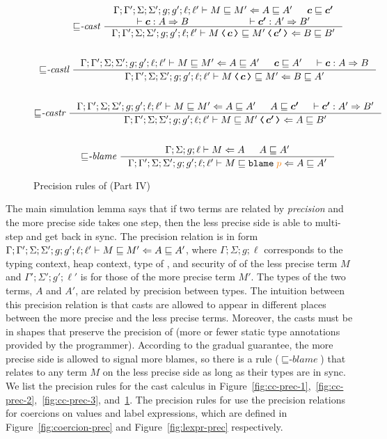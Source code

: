\begin{figure}[tbp]
\raggedright
  {\small
  \begin{gather*}
  {\sqsubseteq}\textit{-cast}~
  \inference
  {\precctx{\Gamma}{\Gamma'}{\Sigma}{\Sigma'}{g}{g'}{\ell}{\ell'}\ccprec{M}{M'}{A}{A'} & \bm{c} \sqsubseteq \bm{c'} \\
   \vdash \bm{c} : A \Rightarrow B & \vdash \bm{c'} : A' \Rightarrow B'}
  {\precctx{\Gamma}{\Gamma'}{\Sigma}{\Sigma'}{g}{g'}{\ell}{\ell'}\ccprec{\cccast{M}{\bm{c}}}{\cccast{M'}{\bm{c'}}}{B}{B'}}
  \\[4ex]
  {\sqsubseteq}\textit{-castl}~
  \inference
  {\precctx{\Gamma}{\Gamma'}{\Sigma}{\Sigma'}{g}{g'}{\ell}{\ell'}\ccprec{M}{M'}{A}{A'} &
   \bm{c} \sqsubseteq A' & \vdash \bm{c} : A \Rightarrow B}
  {\precctx{\Gamma}{\Gamma'}{\Sigma}{\Sigma'}{g}{g'}{\ell}{\ell'}\ccprec{\cccast{M}{\bm{c}}}{M'}{B}{A'}}
  \\[4ex]
  {\sqsubseteq}\textit{-castr}~
  \inference
  {\precctx{\Gamma}{\Gamma'}{\Sigma}{\Sigma'}{g}{g'}{\ell}{\ell'}\ccprec{M}{M'}{A}{A'} &
   A \sqsubseteq \bm{c'} & \vdash \bm{c'} : A' \Rightarrow B'}
  {\precctx{\Gamma}{\Gamma'}{\Sigma}{\Sigma'}{g}{g'}{\ell}{\ell'}\ccprec{M}{\cccast{M'}{\bm{c'}}}{A}{B'}}
  \\[4ex]
  {\sqsubseteq}\textit{-blame}~
  \inference
  {\Gamma; \Sigma; g; \ell \vdash M \Leftarrow A & A \sqsubseteq A'}
  {\precctx{\Gamma}{\Gamma'}{\Sigma}{\Sigma'}{g}{g'}{\ell}{\ell'}\ccprec{M}{\blame{p}}{A}{A'}}
  \end{gather*}}
  \caption{Precision rules of \CC (Part IV)}
  \label{fig:cc-prec-4}
\end{figure}

The main simulation lemma says that if two terms are related by
\textit{precision} and the more precise side takes one step, then the less
precise side is able to multi-step and get back in sync. The precision relation
is in form
${\Gamma};{\Gamma'};{\Sigma};{\Sigma'};{g};{g'};{\ell};{\ell'}\vdash{M}\sqsubseteq{M'}\Leftarrow{A}\sqsubseteq{A'}$,
where $\Gamma;\Sigma;g;\ell$ corresponds to the typing context, heap context,
type of \PC, and security of \PC of the less precise term $M$ and
$\Gamma';\Sigma';g';\ell'$ is for those of the more precise term $M'$. The types
of the two terms, $A$ and $A'$, are related by precision between types. The
intuition between this precision relation is that casts are allowed to appear in
different places between the more precise and the less precise \CC terms.
Moreover, the casts must be in shapes that preserve the precision of \Surface
(more or fewer static type annotations provided by the programmer). According to
the gradual guarantee, the more precise side is allowed to signal more blames,
so there is a rule (${\sqsubseteq}\textit{-blame}$) that relates  to
any term $M$ on the less precise side as long as their types are in sync. We
list the precision rules for the cast calculus \CC in
Figure~\ref{fig:cc-prec-1},~\ref{fig:cc-prec-2},~\ref{fig:cc-prec-3},
and~\ref{fig:cc-prec-4}. The precision rules for \CC use the precision relations
for coercions on values and label expressions, which are defined in
Figure~\ref{fig:coercion-prec} and Figure~\ref{fig:lexpr-prec} respectively.

